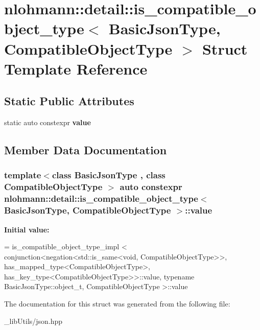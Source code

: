 \hypertarget{structnlohmann_1_1detail_1_1is__compatible__object__type}{}\section{nlohmann\+:\+:detail\+:\+:is\+\_\+compatible\+\_\+object\+\_\+type$<$ Basic\+Json\+Type, Compatible\+Object\+Type $>$ Struct Template Reference}
\label{structnlohmann_1_1detail_1_1is__compatible__object__type}
\subsection*{Static Public Attributes}
\begin{DoxyCompactItemize}
\item 
static auto constexpr {\bfseries value}
\end{DoxyCompactItemize}


\subsection{Member Data Documentation}
\subsubsection[{\texorpdfstring{value}{value}}]{\setlength{\rightskip}{0pt plus 5cm}template$<$class Basic\+Json\+Type , class Compatible\+Object\+Type $>$ auto constexpr {\bf nlohmann\+::detail\+::is\+\_\+compatible\+\_\+object\+\_\+type}$<$ Basic\+Json\+Type, Compatible\+Object\+Type $>$\+::value\hspace{0.3cm}{\ttfamily [static]}}\hypertarget{structnlohmann_1_1detail_1_1is__compatible__object__type_a87cce7bcdcd22cc8517f171705f6a7c7}{}\label{structnlohmann_1_1detail_1_1is__compatible__object__type_a87cce7bcdcd22cc8517f171705f6a7c7}
{\bfseries Initial value\+:}
\begin{DoxyCode}
= is\_compatible\_object\_type\_impl <
                                  conjunction<negation<std::is\_same<void, CompatibleObjectType>>,
                                  has\_mapped\_type<CompatibleObjectType>,
                                  has\_key\_type<CompatibleObjectType>>::value,
                                  \textcolor{keyword}{typename} BasicJsonType::object\_t, CompatibleObjectType >::value
\end{DoxyCode}


The documentation for this struct was generated from the following file\+:\begin{DoxyCompactItemize}
\item 
\+\_\+lib\+Utils/json.\+hpp\end{DoxyCompactItemize}
